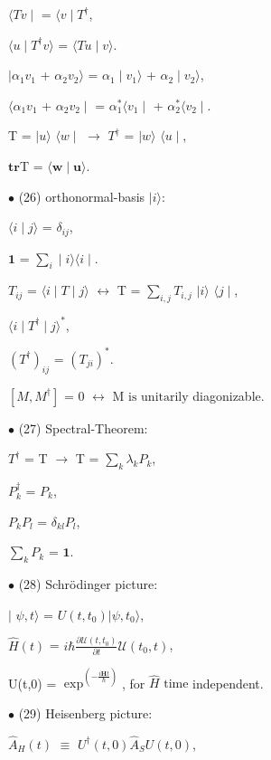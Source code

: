 \documentclass[a4paper, 10pt, onepage]{elegantbook}
\begin{document}
{$\langle Tv \mid$ = $\langle v \mid T^\dagger$, 

$\langle u \mid T^\dagger v \rangle$ = $\langle Tu \mid v \rangle$. 

$\mid \alpha_1 v_1$ + $\alpha_2 v_2 \rangle$ = $\alpha_1 \mid v_1 \rangle$ + $\alpha_2 \mid v_2 \rangle$,  

$\langle \alpha_1 v_1$ + $\alpha_2 v_2 \mid$ = $\alpha_1^* \langle v_1 \mid $ + $\alpha_2^* \langle v_2 \mid $.  

T = $\mid u \rangle$ $\langle w \mid$ $\longrightarrow$ $T^\dagger$ = $\mid w \rangle$ $\langle u \mid$, 

$\mathbf{\textbf{tr}}$T = $\langle \mathbf w \mid \mathbf u \rangle$.  

$\bullet$ (26) orthonormal-basis $\mid i \rangle$: 

$\langle i \mid j \rangle$ = $\delta_{ij}$,  

$\mathbf{1}$  = $\sum_i \mid i \rangle \langle i \mid$.  

$T_{ij}$ = $\langle i\mid T \mid j \rangle$ $\longleftrightarrow$ T = $\sum_{i,j} T_{i,j}$ $\mid i \rangle$ $\langle j 
\mid$,  

$\langle i \mid T^\dagger \mid j \rangle^*$,  

$(T^\dagger)_{ij}$ = $(T_{ji})^*$.  

$[M,M^\dagger]$ = 0 $\longleftrightarrow$ $\text{M is unitarily}$ diagonizable.  

$\bullet$ (27) Spectral-Theorem:   

$T^\dagger$ = T $\longrightarrow$ T = $\sum_k \lambda_k P_k$, 

$P^\dagger_k$ = $P_k$,  

$P_k P_l$ = $\delta_{kl} P_l$,  

$\sum_k P_k$ = $\mathbf{1}$.  

$\bullet$ (28) Schr\"odinger picture:  

$\mid$ $\psi,t \rangle$ = $U(t,t_0) | \psi,t_0 \rangle$, 

$\hat{H}(t)$ = $i \hbar \frac{\partial \mathcal U(t, t_0)}{\partial t} \mathcal U(t_0,t)$,  

U(t,0) = $\exp^{( - \frac{i \hat{\mathbf H} t} {\hbar} ) }$, for $\hat{H}$ $\text{time}$ independent. 

$\bullet$ (29) Heisenberg picture: 

$\hat{A}_H(t)$ $\equiv$ $U^\dagger(t,0) \hat{A}_S U(t,0)$,  

}
\end{document}
